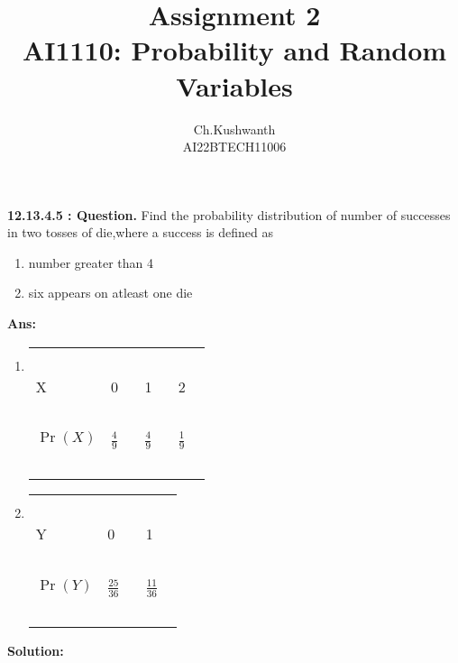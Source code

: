 \documentclass[journal,12pt,onecolumn]{IEEEtran}
\title{\textbf{Assignment 2}
\\ \textbf{AI1110:} Probability and Random Variables}
\author{Ch.Kushwanth
\\ AI22BTECH11006}
\providecommand{\pr}[1]{\ensuremath{\Pr\left(#1\right)}}
\theoremstyle{remark}
\begin{document}
\maketitle
\textbf{12.13.4.5 : Question.}
Find the probability \mbox{distribution} of number of successes in two tosses of die,where a success is defined as
\begin{enumerate}
\item number greater than 4
\item six appears on atleast one die
\end{enumerate}
\textbf{Ans:}
\begin{enumerate}
\item 
\begin{tabular}{|l|l|l|l|}
\hline 
\ & \ & \ & \\
\Large X & \Large 0 \  & \Large 1 \  & \Large 2 \ \\
\hline 
\ & \ & \ & \\
 \Large $\pr{X}$ &  \Large $\frac{4}{9}$ \  &  \Large $\frac{4}{9}$ \  &\Large $\frac{1}{9}$ \ \\
 \ & \ & \ & \\
\hline
\end{tabular}
\vspace{3mm}
\item
\begin{tabular}{|l|l|l|}
\hline 
\ & \ & \ \\
\Large Y & \Large 0 \  & \Large 1 \ \\
\hline 
\ & \ & \ \\
 \Large $\pr{Y}$ &  \Large $\frac{25}{36}$ \  &  \Large $\frac{11}{36}$ \  \\
 \ & \ & \ \\
\hline
\end{tabular}
\end{enumerate}
 \textbf{Solution:}
\end{document}
